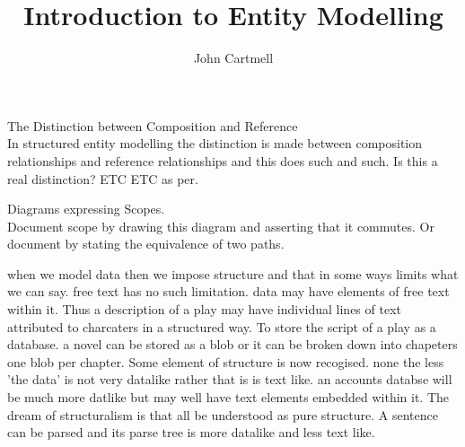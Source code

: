 \documentclass[10pt,a4paper]{article}
\title{Introduction to Entity Modelling}
\author{John Cartmell}
\begin{document}
\maketitle
\iffalse
 
 
 
 
 
 
 
 \fi
 
 \iffalse
 
 
 
 
  
 
 Can I talk about programmking languages? 
terminology subtype and supertype Barker?
non-standard part of the SSADM method.
Use in car example from SSADM
\fi

\begin{noteforfuture}
 The Distinction between Composition and Reference \\
In structured entity modelling the distinction is made between composition relationships and reference relationships and this does such and such. Is this a real distinction? ETC ETC as per.

Diagrams expressing Scopes.\\
Document scope by drawing this diagram and asserting that it commutes. Or document by stating the equivalence of two paths. 
\end{noteforfuture}

\begin{noteforfuture}
when we model data then we impose structure and that in some ways limits what we can say.
free text has no such limitation.
data may have elements of free text within it. Thus a description of a play may have individual lines of text attributed to charcaters in a structured way. To store the script of a play as a database. a novel can be stored as a blob or it can be broken down into chapeters one blob per chapter. Some element of structure is now recogised. none the less 'the data' is not very datalike rather that is is text like. an accounts databse will be much more datlike but may well have text elements embedded within it. The dream of structuralism is that all be understood as pure structure. A sentence can be parsed and its parse tree is more datalike and less text like.
\end{noteforfuture}
\end{document}
